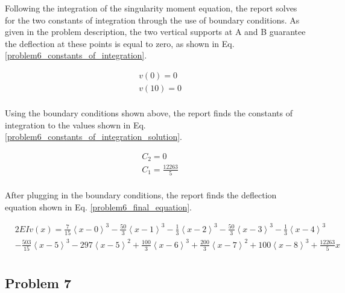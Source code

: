 \documentclass[a4paper]{article}
\begin{document}
Following the integration of the singularity moment equation, the report solves for the two constants of integration through the use of boundary conditions. As given in the problem description, the two vertical supports at A and B guarantee the deflection at these points is equal to zero, as shown in Eq. \ref{problem6_constants_of_integration}.

\begin{equation}
\begin{split}
	& v(0) = 0 \\
	& v(10) = 0 \\
\end{split}
\label{problem6_constants_of_integration}
\end{equation}

Using the boundary conditions shown above, the report finds the constants of integration to the values shown in Eq. \ref{problem6_constants_of_integration_solution}.

\begin{equation}
\begin{split}
	& C_2 = 0 \\
	& C_1 = \frac{12263}{5} \\
\end{split}
\label{problem6_constants_of_integration_solution}
\end{equation}

After plugging in the boundary conditions, the report finds the deflection equation shown in Eq. \ref{problem6_final_equation}.

\begin{equation}
\begin{split}
  & 2EI v(x) = \frac{7}{15}\left<x-0\right>^3 - \frac{50}{3}\left<x-1\right>^3 -  \frac{1}{3}\left<x-2\right>^3 - \frac{50}{3}\left<x-3\right>^3 - \frac{1}{3}\left<x-4\right>^3 \\
  & - \frac{503}{15}\left<x-5\right>^3 - 297\left<x-5\right>^2 + \frac{100}{3}\left<x-6\right>^3 + \frac{200}{3}\left<x-7\right>^2 + 100\left<x-8\right>^3 + \frac{12263}{5}x\\
\end{split}
\label{problem6_final_equation}
\end{equation}



\subsection{Problem 7}
\end{document}
